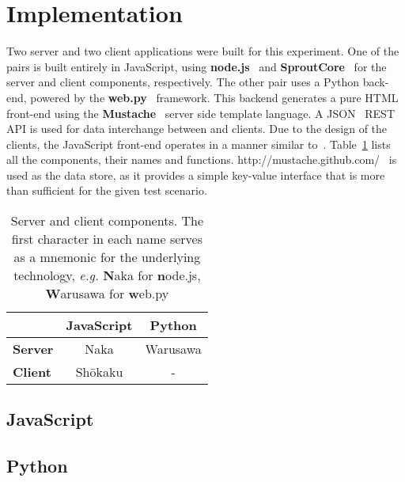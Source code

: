 \section{\label{sec:impl}Implementation}

Two server and two client applications were built for this experiment. One of the pairs is built entirely in JavaScript, using \textbf{node.js}~\cite{node} and \textbf{SproutCore}~\cite{sprout} for the server and client components, respectively. The other pair uses a Python back-end, powered by the \textbf{web.py}~\cite{webpy} framework. This backend generates a pure HTML front-end using the \textbf{Mustache}~\cite{mustache} server side template language. A JSON~\cite{rfc4627} REST API is used for data interchange between and clients. Due to the design of the clients, the JavaScript front-end operates in a manner similar to~\cite{flyhtml}. Table~\ref{tab:comps} lists all the components, their names and functions. http://mustache.github.com/~\cite{redis} is used as the data store, as it provides a simple key-value interface that is more than sufficient for the given test scenario.

\begin{table}
    \begin{center}
        \begin{tabular}{l c c}
            \toprule
            & \textbf{JavaScript} & \textbf{Python} \\
            \midrule
            \textbf{Server} & Naka & Warusawa \\
            \textbf{Client} & Sh\={o}kaku & - \\
            \bottomrule
        \end{tabular}
        \caption{Server and client components. The first character in each name serves as a mnemonic for the underlying technology, \emph{e.g.} \textbf{N}aka for \textbf{n}ode.js, \textbf{W}arusawa for \textbf{w}eb.py}
        \label{tab:comps}
    \end{center}
\end{table}

\subsection{\label{sec:impl:js}JavaScript}

\subsection{\label{sec:impl:pyhtml}Python}

